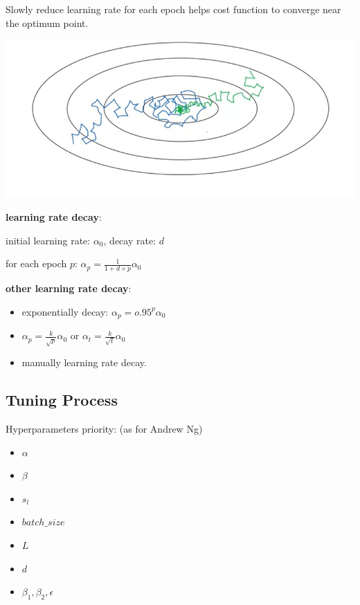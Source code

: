 \documentclass{article}
\begin{document}
Slowly reduce learning rate for each epoch helps cost function to converge near the optimum point.

\begin{center}
\includegraphics[scale=0.4]{./images/learning_rate_decay.png}
\end{center}

\noindent \textbf{learning rate decay}:

\noindent initial learning rate: \(\alpha_{0}\), decay rate: \(d\)

\noindent for each epoch \(p\): \(\alpha_{p} = \frac{1}{1 + d \times p} \alpha_{0}\)

\bigskip

\noindent \textbf{other learning rate decay}:

\begin{itemize}
    \item exponentially decay: \(\alpha_{p} = o.95^{p} \alpha_{0}\)
    \item \(\alpha_{p} = \frac{k}{\sqrt{p}} \alpha_{0}\) or \(\alpha_{t} = \frac{k}{\sqrt{t}} \alpha_{0}\)
    \item manually learning rate decay.
\end{itemize}

\subsection{Tuning Process}

\noindent Hyperparameters priority: (as for Andrew Ng)

\begin{itemize}
    \item \(\alpha\)
    \item \(\beta\)
    \item \(s_{l}\)
    \item \(batch\_size\)
    \item \(L\)
    \item \(d\)
    \item \(\beta_{1}, \beta_{2}, \epsilon\)
\end{itemize}
\end{document}
